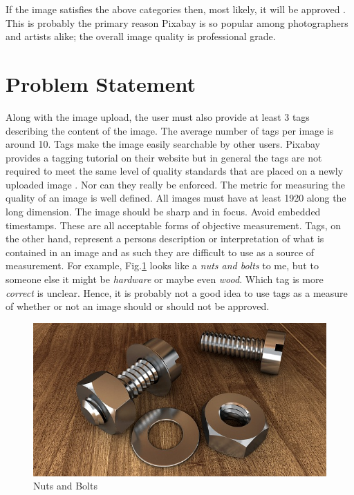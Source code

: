 \documentclass[10pt, a4paper, twocolumn]{article} %
\begin{document}
If the image satisfies the above categories then, most likely, it will be approved \citep{Pixabay:Tagging}.  This is probably the primary reason Pixabay is so popular among photographers and artists alike; the overall image quality is professional grade.


\section{Problem Statement} %

Along with the image upload, the user must also provide at least 3 tags describing the content of the image.  The average number of tags per image is around 10.  Tags make the image easily searchable by other users.  Pixabay provides a tagging tutorial on their website but in general the tags are not required to meet the same level of quality standards that are placed on a newly uploaded image \citep{Pixabay:ImgStandards}. Nor can they really be enforced.  The metric for measuring the quality of an image is well defined.  All images must have at least 1920 along the long dimension.  The image should be sharp and in focus.  Avoid embedded timestamps.  These are all acceptable forms of objective measurement.  Tags, on the other hand, represent a persons description or interpretation of what is contained in an image and as such they are difficult to use as a source of measurement.  For example, Fig.\ref{screw-1924174_640} looks like a \textit{nuts and bolts} to me, but to someone else it might be \textit{hardware} or maybe even \textit{wood}.  Which tag is more \textit{correct} is unclear.  Hence, it is probably not a good idea to use tags as a measure of whether or not an image should or should not be approved. 

\begin{figure}
	\includegraphics[width=\linewidth]{screw-1924174_640.jpg} %
	\caption{Nuts and Bolts} %
	\label{screw-1924174_640} %
\end{figure}
\end{document}
